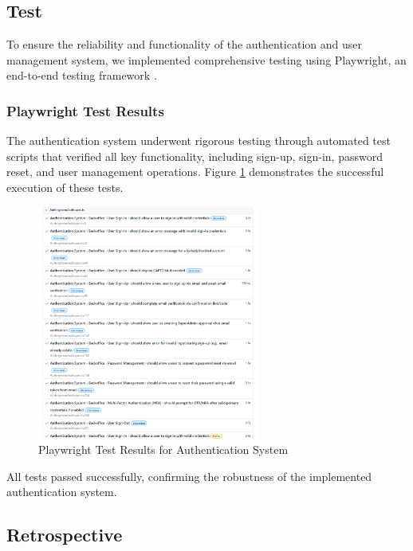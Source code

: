 \newpage

\subsection{Test}
To ensure the reliability and functionality of the authentication and user management system, we implemented comprehensive testing using Playwright, an end-to-end testing framework \cite{PlaywrightDocs2023}.

\subsubsection{Playwright Test Results}
The authentication system underwent rigorous testing through automated test scripts that verified all key functionality, including sign-up, sign-in, password reset, and user management operations. Figure \ref{fig:playwright-tests} demonstrates the successful execution of these tests.
\begin{figure}[htbp]
    \centering
    \includegraphics[width=0.65\textwidth]{images/playwright-test-results.png}
    \caption{Playwright Test Results for Authentication System}
    \label{fig:playwright-tests}
\end{figure}


All tests passed successfully, confirming the robustness of the implemented authentication system.

\subsection{Retrospective}

